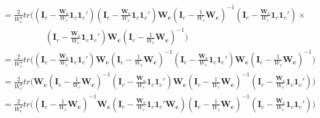 \begin{equation}
\begin{split}
          & = \frac{2}{W^4_c} tr\Bigg(\left(\mathbf{I}_c  - \frac{\mathbf{W_c} }{W_c}  \mathbf{1}_c\mathbf{1}_c' \right)\left(\mathbf{I}_c - \frac{\mathbf{W_c}}{W_c} \mathbf{1}_c\mathbf{1}_c' \right) \mathbf{W_c} \left(\mathbf{I}_c - \frac{1}{W_c} \mathbf{W_c} \right)^{-1}  \left(\mathbf{I}_c - \frac{\mathbf{W_c}}{W_c}  \mathbf{1}_c\mathbf{1}_c' \right)  \times \\
          & \quad \quad \quad \quad \quad \left(\mathbf{I}_c - \frac{\mathbf{W_c}}{W_c}  \mathbf{1}_c\mathbf{1}_c' \right) \mathbf{W_c} \left(\mathbf{I}_c - \frac{1}{W_c} \mathbf{W_c} \right)^{-1}   \Bigg) \\
          & = \frac{2}{W^4_c} tr\Bigg(\left(\mathbf{I}_c  - \frac{\mathbf{W_c} }{W_c}  \mathbf{1}_c\mathbf{1}_c' \right) \mathbf{W_c} \left(\mathbf{I}_c - \frac{1}{W_c} \mathbf{W_c} \right)^{-1} \left(\mathbf{I}_c - \frac{\mathbf{W_c}}{W_c}  \mathbf{1}_c\mathbf{1}_c' \right) \mathbf{W_c} \left(\mathbf{I}_c - \frac{1}{W_c} \mathbf{W_c} \right)^{-1}   \Bigg) \\
          & = \frac{2}{W^4_c} tr\Bigg( \mathbf{W_c} \left(\mathbf{I}_c - \frac{1}{W_c} \mathbf{W_c} \right)^{-1} \left(\mathbf{I}_c  - \frac{\mathbf{W_c} }{W_c}  \mathbf{1}_c\mathbf{1}_c' \right)  \mathbf{W_c} \left(\mathbf{I}_c - \frac{1}{W_c} \mathbf{W_c} \right)^{-1}   \left(\mathbf{I}_c - \frac{\mathbf{W_c}}{W_c}  \mathbf{1}_c\mathbf{1}_c' \right)   \Bigg) \\
          & = \frac{2}{W^4_c} tr\Bigg(  \left(\mathbf{I}_c - \frac{1}{W_c} \mathbf{W_c} \right)^{-1} \mathbf{W_c} \left(\mathbf{I}_c  - \frac{\mathbf{W_c} }{W_c}  \mathbf{1}_c\mathbf{1}_c'\mathbf{W_c} \right)   \left(\mathbf{I}_c - \frac{1}{W_c} \mathbf{W_c} \right)^{-1}   \left(\mathbf{I}_c - \frac{\mathbf{W_c}}{W_c}  \mathbf{1}_c\mathbf{1}_c' \right)   \Bigg) \\ 
    \end{split}
    \nonumber
\end{equation}

